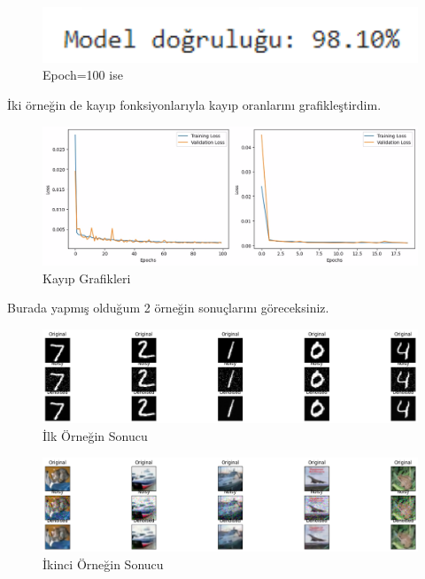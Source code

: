 \documentclass{article}
\begin{document}
\renewcommand{\figurename}{Şekil}

\begin{figure}[htbp]
     \centering
\includegraphics[angle=360,width=1\textwidth]{100epoch.png}\centering 
  \caption{Epoch=100 ise}
  \label{fig:resim_etiketi}
\end{figure}

\clearpage
\noindent İki örneğin de kayıp fonksiyonlarıyla kayıp oranlarını grafikleştirdim. \vspace{0.5cm}

\renewcommand{\figurename}{Şekil}

\begin{figure}[htbp]
     \centering
\includegraphics[angle=360,width=1\textwidth]{yz3(4).jpg}\centering 
  \caption{Kayıp Grafikleri}
  \label{fig:resim_etiketi}
\end{figure}



\noindent Burada yapmış olduğum 2 örneğin sonuçlarını göreceksiniz. \vspace{0.5 cm}


\begin{figure}[htbp]
     \centering
 \includegraphics[angle=360,width=1\textwidth]{yz3.png}\centering 
  \caption{İlk Örneğin Sonucu}
  \label{fig:resim_etiketi}
\end{figure} \vspace{1 cm}


\begin{figure}[htbp]
     \centering
\includegraphics[angle=360,width=1\textwidth]{yz3(1).png}\centering 
  \caption{İkinci Örneğin Sonucu}
  \label{fig:resim_etiketi}
\end{figure}

\clearpage
\newpage



\end{document}
